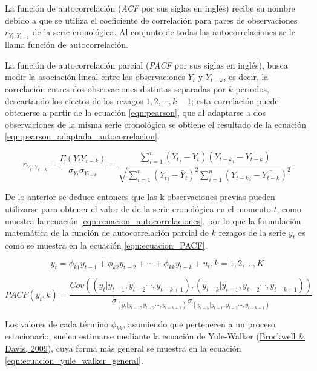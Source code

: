 \documentclass[
]{article}
\begin{document}
La función de autocorrelación (\emph{ACF} por sus siglas en inglés)
recibe su nombre debido a que se utiliza el coeficiente de correlación
para pares de observaciones \(r_{Y_t, Y_{t-1}}\) de la serie
cronológica. Al conjunto de todas las autocorrelaciones se le llama
función de autocorrelación.

La función de autocorrelación parcial (\emph{PACF} por sus siglas en
inglés), busca medir la asociación lineal entre las observaciones
\(Y_t\) y \(Y_{t-k}\), es decir, la correlación entres dos observaciones
distintas separadas por \(k\) periodos, descartando los efectos de los
rezagos \(1,2, \cdots ,k-1\); esta correlación puede obtenerse a partir
de la ecuación \ref{eqn:pearson}, que al adaptarse a dos observaciones
de la misma serie cronológica se obtiene el resultado de la ecuación
\ref{eqn:pearson_adaptada_autocorrelacion}.

\begin{equation}
\label{eqn:pearson_adaptada_autocorrelacion}
r_{{Y_t},{Y_{t-k}}}=\frac{E({Y_t}{Y_{t-k}})}{\sigma_{Y_t} \sigma_{Y_{t-k}}} = \frac{\sum_{i=1}^n \left({Y_t}_i- \bar{Y}_t \right) \left({Y_{t-k}}_i- \bar {Y_{t-k}}\right)}{\sqrt{\sum_{i=1}^n \left({Y_t}_i- \bar{Y}_t \right)^2 \sum_{i=1}^n \left({Y_{t-k}}_i- \bar {Y_{t-k}}\right)^2}}
\end{equation}

De lo anterior se deduce entonces que las k observaciones previas pueden
utilizarse para obtener el valor de de la serie cronológica en el
momento \(t\), como muestra la ecuación
\ref{eqn:ecuacion_autocorrelaciones}, por lo que la formulación
matemática de la función de autocorrelación parcial de \(k\) rezagos de
la serie \(y_t\) es como se muestra en la ecuación
\ref{eqn:ecuacion_PACF}.

\begin{equation}
\label{eqn:ecuacion_autocorrelaciones}
y_t=\phi_{k1}y_{t-1}+\phi_{k2}y_{t-2}+\cdots+\phi_{kk}y_{t-k}+u_t,k=1,2,...,K
\end{equation}

\begin{equation}
\label{eqn:ecuacion_PACF}
PACF(y_t,k)=\frac{Cov\left(\left(y_t|y_{t-1},y_{t-2}\cdots,y_{t-k+1}\right),\left(y_{t-k}|y_{t-1},y_{t-2}\cdots,y_{t-k+1}\right)\right)}{\sigma_{\left(y_t|y_{t-1},y_{t-2}\cdots,y_{t-k+1}\right)}\sigma_{\left(y_{t-k}|y_{t-1},y_{t-2}\cdots,y_{t-k+1}\right)}}
\end{equation}

Los valores de cada término \(\phi_{kk}\), asumiendo que pertenecen a un
proceso estacionario, suelen estimarse mediante la ecuación de
Yule-Walker (\protect\hyperlink{ref-yule.walker}{Brockwell \& Davis,
2009}), cuya forma más general se muestra en la ecuación
\ref{eqn:ecuacion_yule_walker_general}.
\end{document}
